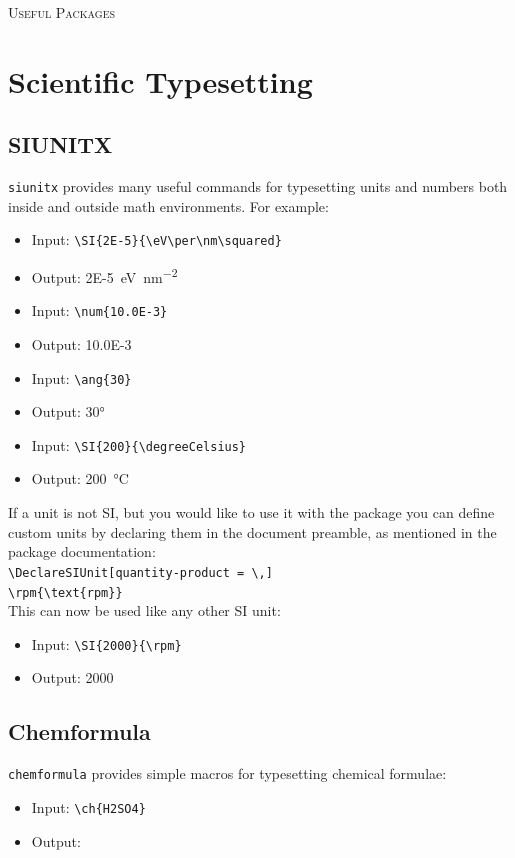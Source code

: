 \begin{center}
    \LARGE \textsc{Useful Packages}
\end{center}
%
\section{Scientific Typesetting}
%
    \subsection{SIUNITX}
%
\verb|siunitx| provides many useful commands for typesetting units and numbers both inside and outside math environments. 
For example:
\begin{itemize}
    \item Input: \verb|\SI{2E-5}{\eV\per\nm\squared}|
    \item Output: \SI{2E-5}{\eV\per\nm\squared}
    \item Input: \verb|\num{10.0E-3}|
    \item Output: \num{10.0E-3}
    \item Input: \verb|\ang{30}|
    \item Output: \ang{30}
    \item Input: \verb|\SI{200}{\degreeCelsius}|
    \item Output: \SI{200}{\degreeCelsius}
\end{itemize}
If a unit is not SI, but you would like to use it with the package you can define custom units by declaring them in the document preamble, as mentioned in the package documentation:\\
\verb|\DeclareSIUnit[quantity-product = \,]|\\
\verb|\rpm{\text{rpm}}|\\
This can now be used like any other SI unit:
\begin{itemize}
    \item Input: \verb|\SI{2000}{\rpm}|
    \item Output: \SI{2000}{\rpm}
\end{itemize}
%
    \subsection{Chemformula}
%
\verb|chemformula| provides simple macros for typesetting chemical formulae:
\begin{itemize}
    \item Input: \verb|\ch{H2SO4}|
    \item Output: 
\end{itemize}
%
